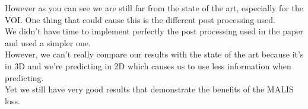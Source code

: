 However as you can see we are still far from the state of the art, especially for the VOI. One thing that could cause this is the different post processing used.\\ 
We didn’t have time to implement perfectly the post processing used in the paper and used a simpler one.\\
However, we can’t really compare our results with the state of the art because it’s in 3D and we’re predicting in 2D which causes us to use less information when predicting.\\
Yet we still have very good results that demonstrate the benefits of the MALIS loss.\\

